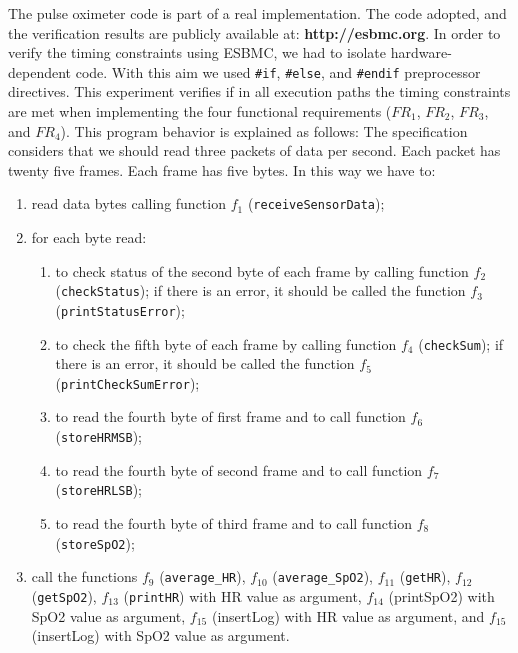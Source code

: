 \documentclass{llncs}
\begin{document}
The pulse oximeter code is part of a real implementation.
The code adopted, and the verification results are publicly available at: {\bf http://esbmc.org}. 
In order to verify the timing constraints using ESBMC, we had to isolate hardware-dependent code. 
With this aim we used {\tt \#if}, {\tt \#else}, and {\tt \#endif} preprocessor directives.
This experiment verifies if in all execution paths the timing constraints are met 
when implementing the four functional requirements ($FR_1$, $FR_2$, $FR_3$, and $FR_4$). 
This program behavior is explained as follows:
The specification considers that we should read three packets of data per second. 
Each packet has twenty five frames.
Each frame has five bytes.
In this way we have to:
\begin{enumerate}
  \item read data bytes calling function $f_1$ ({\tt receiveSensorData});
  \item for each byte read:
  \begin{enumerate}
    \item to check status of the second byte of each frame by calling function $f_2$ ({\tt checkStatus}); 
    if there is an error, it should be called the function $f_3$ ({\tt printStatusError});
    \item to check the fifth byte of each frame by calling function $f_4$ ({\tt checkSum}); 
    if there is an error, it should be called the function $f_5$ ({\tt printCheckSumError});
    \item to read the fourth byte of first frame and to call function $f_6$ ({\tt storeHRMSB});
    \item to read the fourth byte of second frame and to call function $f_7$ ({\tt storeHRLSB});
    \item to read the fourth byte of third frame and to call function $f_8$ ({\tt storeSpO2});
  \end{enumerate}
  \item call the functions $f_9$ ({\tt average\_HR}), $f_{10}$ ({\tt average\_SpO2}), $f_{11}$ ({\tt getHR}), $f_{12}$ ({\tt getSpO2}), 
$f_{13}$ ({\tt printHR}) with HR value as argument, $f_{14}$ ({printSpO2}) with SpO2 value as argument, 
$f_{15}$ ({insertLog}) with HR value as argument, and $f_{15}$ ({insertLog}) with SpO2 value as argument.
\end{enumerate}
\end{document}
